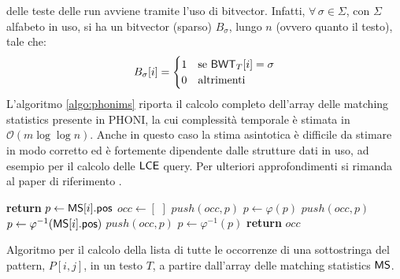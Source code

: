 delle teste delle run avviene tramite l'uso di bitvector. Infatti,
$\forall\, \sigma \in \Sigma$, con $\Sigma$ alfabeto in uso, si ha un
bitvector (sparso) $B_{\sigma}$, lungo $n$ (ovvero quanto il testo), tale che:
\begin{equation}
  \label{eq:rlbwt10}
  B_{\sigma}[i]=
  \begin{cases}
    1&\mbox{se } \mbox{\rm {\sf BWT}}_T[i]=\sigma\\
    0&\mbox{altrimenti}
  \end{cases}
\end{equation}
L'algoritmo \ref{algo:phonims} \cite{phoni}
riporta il calcolo completo dell'array delle matching statistics presente in
PHONI, la cui 
complessità temporale è stimata in $\mathcal{O}(m\log\log n)$.
Anche in questo caso la stima asintotica è difficile da stimare in modo 
corretto ed è fortemente dipendente dalle strutture dati in uso, ad esempio 
per il calcolo delle $\mbox{\rm {\sf LCE}}$ query.
Per ulteriori approfondimenti si rimanda al paper di riferimento
\cite{phoni}.
\begin{algorithm}
  \small
  \begin{algorithmic}[1]
    \State \textbf{return}
    \EndIf
    \State $p\gets \mbox{\rm {\sf MS}}[i].\mbox{\rm {\sf pos}}$
    \State $occ\gets [\,\,]$
    \State $push(occ, p)$
    \State $p\gets \varphi(p)$
    \State $push(occ, p)$
    \EndWhile
    \State $p\gets \varphi^{-1}(\mbox{\rm {\sf MS}}[i].\mbox{\rm {\sf pos}})$
    \State $push(occ, p)$
    \State $p\gets \varphi^{-1}(p)$
    \EndWhile
    \State \textbf{return} $occ$
    \EndFunction
  \end{algorithmic}
  \caption{Algoritmo per il calcolo della lista di tutte le occorrenze di una
  sottostringa del pattern, $P[i,j]$, in un testo $T$, a partire dall'array
  delle matching statistics $\mbox{\rm {\sf MS}}$.}
  \label{algo:expand}
\end{algorithm}

